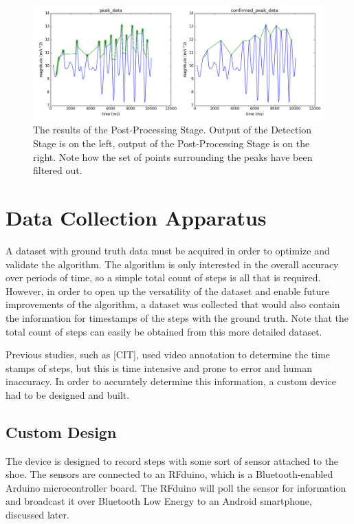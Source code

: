             \begin{figure}[!th]
                \includegraphics[width=\textwidth]{Images/post_stage.png}
                \centering
                \caption{The results of the Post-Processing Stage. Output of the Detection Stage is on the left, output of the Post-Processing Stage is on the right. Note how the set of points surrounding the peaks have been filtered out.}
                \label{img_post_stage}
            \end{figure}

    \chapter{Data Collection Apparatus}

        A dataset with ground truth data must be acquired in order to optimize and validate the algorithm. The algorithm is only interested in the overall accuracy over periods of time, so a simple total count of steps is all that is required. However, in order to open up the versatility of the dataset and enable future improvements of the algorithm, a dataset was collected that would also contain the information for timestamps of the steps with the ground truth. Note that the total count of steps can easily be obtained from this more detailed dataset. 

        Previous studies, such as [CIT], used video annotation to determine the time stamps of steps, but this is time intensive and prone to error and human inaccuracy. In order to accurately determine this information, a custom device had to be designed and built.

        \section{Custom Design}

            The device is designed to record steps with some sort of sensor attached to the shoe. The sensors are connected to an RFduino, which is a Bluetooth-enabled Arduino microcontroller board. The RFduino will poll the sensor for information and broadcast it over Bluetooth Low Energy to an Android smartphone, discussed later. 


